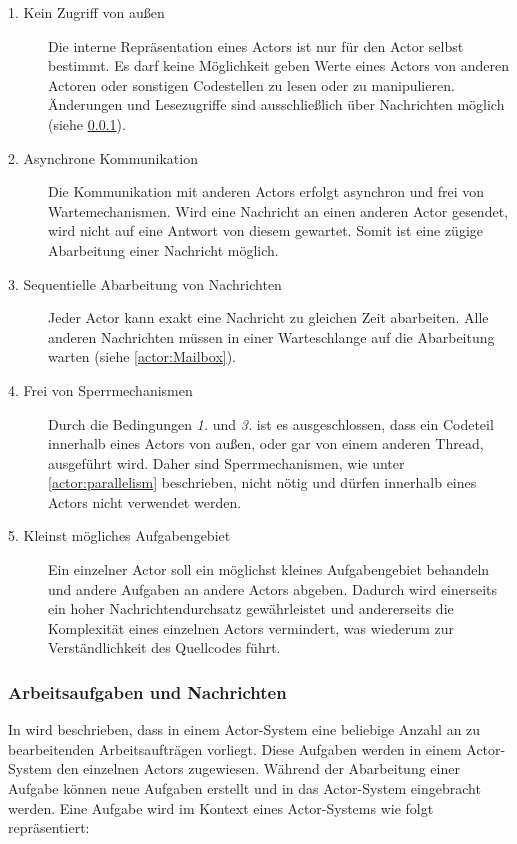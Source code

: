 \begin{description}
    \item[1. Kein Zugriff von außen]\label{actor:requirements:shareNothing}
    Die interne Repräsentation eines Actors ist nur für den Actor selbst bestimmt. Es darf keine Möglichkeit geben Werte eines Actors von anderen Actoren oder sonstigen Codestellen zu lesen oder zu manipulieren. Änderungen und Lesezugriffe sind ausschließlich über Nachrichten möglich (siehe \ref{actors:messages}). 
    \item[2. Asynchrone Kommunikation]\label{actor:requirements:AsynchronCommunication}
    Die Kommunikation mit anderen Actors erfolgt asynchron und frei von Wartemechanismen. Wird eine Nachricht an einen anderen Actor gesendet, wird nicht auf eine Antwort von diesem gewartet. Somit ist eine zügige Abarbeitung einer Nachricht möglich.
    \item[3. Sequentielle Abarbeitung von Nachrichten]
    Jeder Actor kann exakt eine Nachricht zu gleichen Zeit abarbeiten. Alle anderen Nachrichten müssen in einer Warteschlange auf die Abarbeitung warten (siehe \ref{actor:Mailbox}).
    \item[4. Frei von Sperrmechanismen]
    Durch die Bedingungen \textit{1.} und  \textit{3.} ist es ausgeschlossen, dass ein Codeteil innerhalb eines Actors von außen, oder gar von einem anderen Thread, ausgeführt wird. Daher sind Sperrmechanismen, wie unter \ref{actor:parallelism} beschrieben, nicht nötig und dürfen innerhalb eines Actors nicht verwendet werden.
    \item[5. Kleinst mögliches Aufgabengebiet]
    Ein einzelner Actor soll ein möglichst kleines Aufgabengebiet behandeln und andere Aufgaben an andere Actors abgeben. Dadurch wird einerseits ein hoher Nachrichtendurchsatz gewährleistet und andererseits die Komplexität eines einzelnen Actors vermindert, was wiederum zur Verständlichkeit des Quellcodes führt.
\end{description}

\subsubsection{Arbeitsaufgaben und Nachrichten}\label{actors:messages}
In \cite{Agha1985ActorsSystems} wird beschrieben, dass in einem Actor-System eine beliebige Anzahl an zu bearbeitenden Arbeitsaufträgen vorliegt. Diese Aufgaben werden in einem Actor-System den einzelnen Actors zugewiesen. Während der Abarbeitung einer Aufgabe können neue Aufgaben erstellt und in das Actor-System eingebracht werden. Eine Aufgabe wird im Kontext eines Actor-Systems wie folgt repräsentiert:


